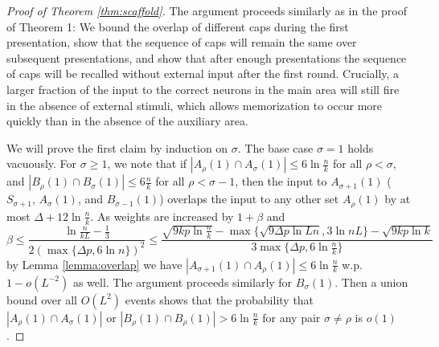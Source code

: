 \documentclass[12pt,nosubfloats]{alt2024} %
\newcommand{\1}{\mathbbm{1}}
\begin{document}
\begin{proof}[Proof of Theorem \ref{thm:scaffold}]
The argument proceeds similarly as in the proof of Theorem 1: We bound the overlap of different caps during the first presentation, show that the sequence of caps will remain the same over subsequent presentations, and show that after enough presentations the sequence of caps will be recalled without external input after the first round. Crucially, a larger fraction of the input to the correct neurons in the main area will still fire in the absence of external stimuli, which allows memorization to occur more quickly than in the absence of the auxiliary area.

We will prove the first claim by induction on $\sigma$. The base case $\sigma = 1$ holds vacuously. For $\sigma \ge 1$, we note that if $|A_{\rho}(1) \cap A_{\sigma}(1)| \le 6\ln \frac{n}{k}$ for all $\rho < \sigma$, and $|B_{\rho}(1) \cap B_{\sigma}(1)| \le 6\frac{n}{k}$ for all $\rho < \sigma - 1$, then the input to $A_{\sigma+1}(1)$ ($S_{\sigma+1}$, $A_\sigma(1)$, and $B_{\sigma-1}(1)$) overlaps the input to any other set $A_{\rho}(1)$ by at most $\Delta + 12 \ln \frac{n}{k}$. As weights are increased by $1 + \beta$ and
\[\beta \le \frac{\ln \frac{n}{kL} - \frac{1}{3}}{2 (\max \{\Delta p, 6 \ln n\})^2 } \le \frac{\sqrt{9kp \ln \frac{n}{k}} - \max\{\sqrt{9 \Delta p \ln Ln}, 3\ln nL\} - \sqrt{9kp \ln k}}{3\max \{\Delta p, 6 \ln \frac{n}{k}\} }\]
by Lemma \ref{lemma:overlap} we have $|A_{\sigma+1}(1) \cap A_{\rho}(1)| \le 6\ln \frac{n}{k}$ w.p. $1 - o(L^{-2})$ as well. The argument proceeds similarly for $B_\sigma(1)$. Then a union bound over all $O(L^2)$ events shows that the probability that $|A_{\rho}(1) \cap A_{\sigma}(1)|$ or $|B_{\rho}(1) \cap B_{\rho}(1)| > 6\ln \frac{n}{k}$ for any pair $\sigma \neq \rho$ is $o(1)$.


\end{proof}
\end{document}
